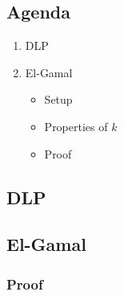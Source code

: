 

\subsection*{Agenda}
\begin{enumerate}
\item DLP
\item El-Gamal
  \begin{itemize}
  \item Setup
  \item Properties of $k$
  \item Proof
  \end{itemize}
\end{enumerate}

\subsection{DLP}


\subsection{El-Gamal}


\subsubsection*{Proof}

